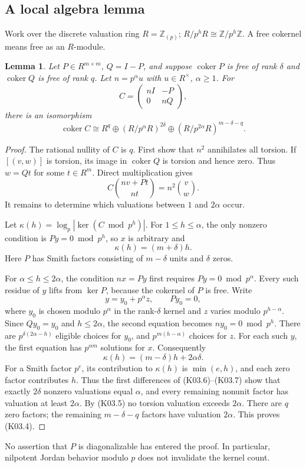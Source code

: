 \documentclass[11pt,a4paper]{article}
\newtheorem{lemma}[theorem]{Lemma}
\theoremstyle{definition}\newtheorem{definition}[theorem]{Definition}
\theoremstyle{remark}\newtheorem{remark}[theorem]{Remark}
\newcommand{\Z}{\mathbb Z}\newcommand{\Q}{\mathbb Q}\newcommand{\F}{\mathbb F}
\DeclareMathOperator{\coker}{coker}\DeclareMathOperator{\diag}{diag}\DeclareMathOperator{\rank}{rank}
\numberwithin{equation}{section}
\begin{document}
\subsection{A local algebra lemma}\label{K03-sec-2}
Work over the discrete valuation ring $R=\Z_{(p)}$; $R/p^hR\cong\Z/p^h\Z$. A free cokernel means free as an $R$-module.
\begin{lemma}\label{K03-local}
Let $P\in R^{m\times m}$, $Q=I-P$, and suppose $\coker P$ is free of rank $\delta$ and $\coker Q$ is free of rank $q$. Let $n=p^\alpha u$ with $u\in R^\times$, $\alpha\geq1$. For
\[
 C=\begin{pmatrix}nI&-P\\0&nQ\end{pmatrix},
\]
there is an isomorphism
\[
 \coker C\cong R^q\oplus(R/p^\alpha R)^{2\delta}
                 \oplus(R/p^{2\alpha}R)^{m-\delta-q}.          \tag{K03.4}
\]
\end{lemma}
\begin{proof}
The rational nullity of $C$ is $q$. First show that $n^2$ annihilates all torsion. If $[(v,w)]$ is torsion, its image in $\coker Q$ is torsion and hence zero. Thus $w=Qt$ for some $t\in R^m$. Direct multiplication gives
\[
 C\binom{nv+Pt}{nt}=n^2\binom vw.                            \tag{K03.5}
\]
It remains to determine which valuations between $1$ and $2\alpha$ occur.

Let $\kappa(h)=\log_p|\ker(C\bmod p^h)|$. For $1\leq h\leq\alpha$, the only nonzero condition is $Py=0\bmod p^h$, so $x$ is arbitrary and
\[
 \kappa(h)=(m+\delta)h.                                      \tag{K03.6}
\]
Here $P$ has Smith factors consisting of $m-\delta$ units and $\delta$ zeros.

For $\alpha\leq h\leq2\alpha$, the condition $nx=Py$ first requires $Py=0\bmod p^\alpha$. Every such residue of $y$ lifts from $\ker P$, because the cokernel of $P$ is free. Write
\[
 y=y_0+p^\alpha z,\qquad Py_0=0,
\]
where $y_0$ is chosen modulo $p^\alpha$ in the rank-$\delta$ kernel and $z$ varies modulo $p^{h-\alpha}$. Since $Qy_0=y_0$ and $h\leq2\alpha$, the second equation becomes $ny_0=0\bmod p^h$. There are $p^{\delta(2\alpha-h)}$ eligible choices for $y_0$, and $p^{m(h-\alpha)}$ choices for $z$. For each such $y$, the first equation has $p^{\alpha m}$ solutions for $x$. Consequently
\[
 \kappa(h)=(m-\delta)h+2\alpha\delta.                         \tag{K03.7}
\]
For a Smith factor $p^e$, its contribution to $\kappa(h)$ is $\min(e,h)$, and each zero factor contributes $h$. Thus the first differences of (K03.6)--(K03.7) show that exactly $2\delta$ nonzero valuations equal $\alpha$, and every remaining nonunit factor has valuation at least $2\alpha$. By (K03.5) no torsion valuation exceeds $2\alpha$. There are $q$ zero factors; the remaining $m-\delta-q$ factors have valuation $2\alpha$. This proves (K03.4).
\end{proof}
No assertion that $P$ is diagonalizable has entered the proof. In particular, nilpotent Jordan behavior modulo $p$ does not invalidate the kernel count.
\end{document}
